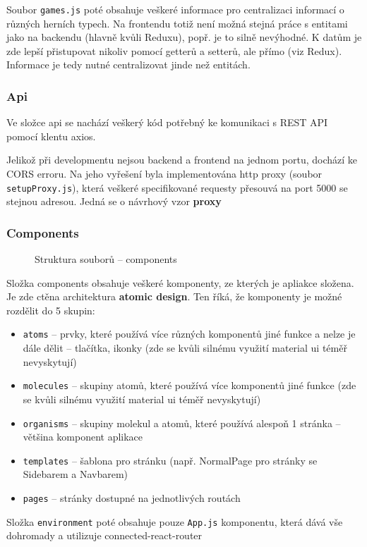 \documentclass[a4paper,oneside,12pt]{report}
\begin{document}
Soubor \texttt{games.js} poté obsahuje veškeré informace pro centralizaci informací o různých herních typech. Na frontendu totiž není možná stejná práce s entitami jako na backendu (hlavně kvůli Reduxu), popř. je to silně nevýhodné. K datům je zde lepší přistupovat nikoliv pomocí getterů a setterů, ale přímo (viz Redux). Informace je tedy nutné centralizovat jinde než entitách.

\subsubsection{Api}
Ve složce api se nachází veškerý kód potřebný ke komunikaci s REST API pomocí klentu axios.

Jelikož při developmentu nejsou backend a frontend na jednom portu, dochází ke CORS erroru. Na jeho vyřešení byla implementována http proxy (soubor \texttt{setupProxy.js}), která veškeré specifikované requesty přesouvá na port 5000 se stejnou adresou. Jedná se o návrhový vzor \textbf{proxy}

\subsubsection{Components}

\begin{figure}[H]
   \caption[Struktura souborů -- components]{Struktura souborů -- components}
   \label{fig:frontendStructureComponentes}
\end{figure}
Složka components obsahuje veškeré komponenty, ze kterých je apliakce složena. Je zde ctěna architektura \textbf{atomic design}. Ten říká, že komponenty je možné rozdělit do 5 skupin:
\begin{itemize}
   \item \texttt{atoms} -- prvky, které používá více různých komponentů jiné funkce a nelze je dále dělit -- tlačítka, ikonky (zde se kvůli silnému využití material ui téměř nevyskytují)
   \item \texttt{molecules} -- skupiny atomů, které používá více komponentů jiné funkce (zde se kvůli silnému využití material ui téměř nevyskytují)
   \item \texttt{organisms} -- skupiny molekul a atomů, které používá alespoň 1 stránka -- většina komponent aplikace
   \item \texttt{templates} -- šablona pro stránku (např. NormalPage pro stránky se Sidebarem a Navbarem)
   \item \texttt{pages} -- stránky dostupné na jednotlivých routách
\end{itemize}
Složka \texttt{environment} poté obsahuje pouze \texttt{App.js} komponentu, která dává vše dohromady a utilizuje connected-react-router
\end{document}

